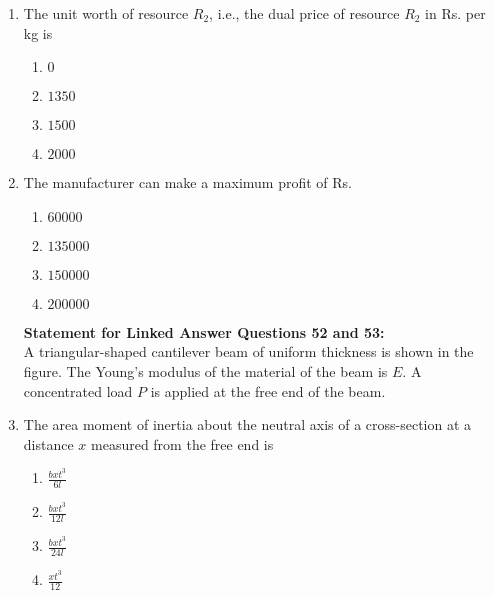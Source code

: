 \documentclass[journal,12pt,twocolumn]{IEEEtran}
\theoremstyle{remark}
\begin{document}
\begin{enumerate}[start=40]
    \item The unit worth of resource $R_2$, i.e., the dual price of resource $R_2$ in Rs. per kg is
    \begin{enumerate}
        \item $0$
        \item $1350$
        \item $1500$
        \item $2000$
    \end{enumerate}

    \item The manufacturer can make a maximum profit of Rs.
    \begin{enumerate}
        \item $60000$
        \item $135000$
        \item $150000$
        \item $200000$
    \end{enumerate}



\textbf{Statement for Linked Answer Questions 52 and 53:} \\
A triangular-shaped cantilever beam of uniform thickness is shown in the figure. The Young's modulus of the material of the beam is $E$. A concentrated load $P$ is applied at the free end of the beam.


    \item The area moment of inertia about the neutral axis of a cross-section at a distance $x$ measured from the free end is
    \begin{enumerate}
        \item $\frac{b x t^3}{6l}$
        \item $\frac{b x t^3}{12l}$
        \item $\frac{b x t^3}{24l}$
        \item $\frac{ x t^3}{12}$
    \end{enumerate}

    

    




    


\end{enumerate}
\end{document}
